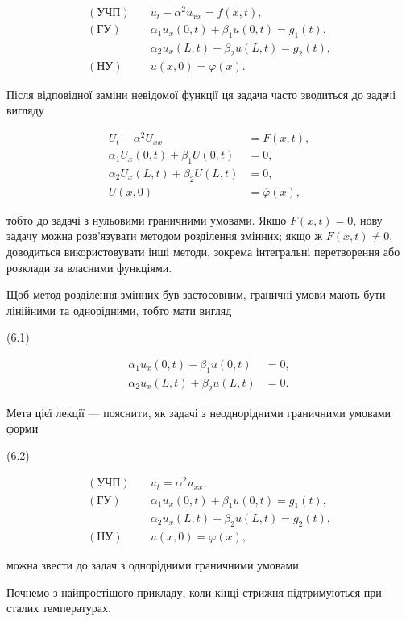 \[
\begin{aligned}
(\text{УЧП})\quad & u_t - \alpha^2 u_{xx} = f(x,t), \\
(\text{ГУ})\quad & \alpha_1 u_x(0,t) + \beta_1 u(0,t) = g_1(t), \\
& \alpha_2 u_x(L,t) + \beta_2 u(L,t) = g_2(t), \\
(\text{НУ})\quad & u(x,0) = \varphi(x).
\end{aligned}
\]

Після відповідної заміни невідомої функції ця задача часто зводиться до задачі вигляду

\[
\begin{aligned}
U_t - \alpha^2 U_{xx} &= F(x,t), \\
\alpha_1 U_x(0,t) + \beta_1 U(0,t) &= 0, \\
\alpha_2 U_x(L,t) + \beta_2 U(L,t) &= 0, \\
U(x,0) &= \overline{\varphi}(x),
\end{aligned}
\]

тобто до задачі з нульовими граничними умовами. Якщо \(F(x,t)=0\), нову задачу можна розв'язувати методом розділення змінних; якщо ж \(F(x,t)\neq 0\), доводиться використовувати інші методи, зокрема інтегральні перетворення або розклади за власними функціями.

Щоб метод розділення змінних був застосовним, граничні умови мають бути лінійними та однорідними, тобто мати вигляд

(6.1)

\[
\begin{aligned}
\alpha_1 u_x(0,t) + \beta_1 u(0,t) &= 0, \\
\alpha_2 u_x(L,t) + \beta_2 u(L,t) &= 0.
\end{aligned}
\]

Мета цієї лекції --- пояснити, як задачі з неоднорідними граничними умовами форми

(6.2)

\[
\begin{aligned}
(\text{УЧП})\quad & u_t = \alpha^2 u_{xx}, \\
(\text{ГУ})\quad & \alpha_1 u_x(0,t) + \beta_1 u(0,t) = g_1(t), \\
& \alpha_2 u_x(L,t) + \beta_2 u(L,t) = g_2(t), \\
(\text{НУ})\quad & u(x,0) = \varphi(x),
\end{aligned}
\]

можна звести до задач з однорідними граничними умовами.

Почнемо з найпростішого прикладу, коли кінці стрижня підтримуються при сталих температурах.

